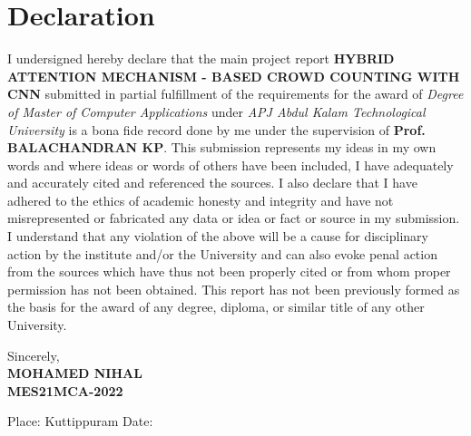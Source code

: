 \documentclass[12pt]{report}
\begin{document}
\chapter*{Declaration}
\thispagestyle{empty}


I undersigned hereby declare that the main project report \textbf{HYBRID ATTENTION MECHANISM - BASED CROWD COUNTING WITH CNN} submitted in partial fulfillment of the requirements for the award of \textit{Degree of Master of Computer Applications} under \textit{APJ Abdul Kalam Technological University} is a bona fide record done by me under the supervision of \textbf{Prof. BALACHANDRAN KP}. This submission represents my ideas in my own words and where ideas or words of others have been included, I have adequately and accurately cited and referenced the sources. I also declare that I have adhered to the ethics of academic honesty and integrity and have not misrepresented or fabricated any data or idea or fact or source in my submission. I understand that any violation of the above will be a cause for disciplinary action by the institute and/or the University and can also evoke penal action from the sources which have thus not been properly cited or from whom proper permission has not been obtained. This report has not been previously formed as the basis for the award of any degree, diploma, or similar title of any other University.

\vspace{3cm}


\begin{flushright}
Sincerely, \\
\textbf{MOHAMED NIHAL \\
MES21MCA-2022}\\
\end{flushright}

\begin{flushleft}
Place: Kuttippuram \newline \newline
Date:
\end{flushleft}
\end{document}
